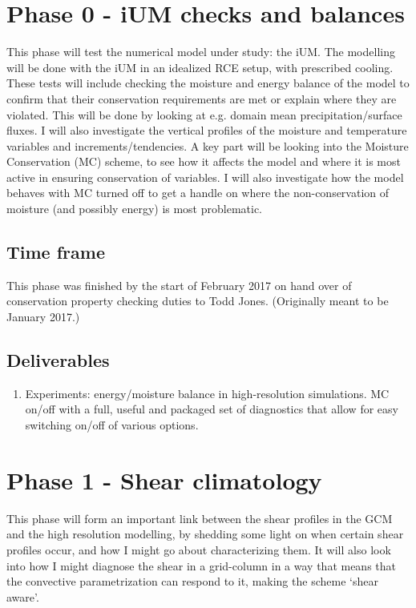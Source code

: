 \documentclass[11pt,a4paper]{article}
\begin{document}
\section*{Phase 0 - iUM checks and balances}
This phase will test the numerical model under study: the iUM. The modelling will be done with the iUM in an idealized RCE setup, with prescribed cooling. These tests will include checking the moisture and energy balance of the model to confirm that their conservation requirements are met or explain where they are violated. This will be done by looking at e.g. domain mean precipitation/surface fluxes. I will also investigate the vertical profiles of the moisture and temperature variables and increments/tendencies. A key part will be looking into the Moisture Conservation (MC) scheme, to see how it affects the model and where it is most active in ensuring conservation of variables. I will also investigate how the model behaves with MC turned off to get a handle on where the non-conservation of moisture (and possibly energy) is most problematic.

\subsection*{Time frame}

This phase was finished by the start of February 2017 on hand over of conservation property checking duties to Todd Jones. (Originally meant to be January 2017.)

\subsection*{Deliverables}
\begin{enumerate}
    \item Experiments: energy/moisture balance in high-resolution simulations. MC on/off with a full, useful and packaged set of diagnostics that allow for easy switching on/off of various options.
\end{enumerate}

\section*{Phase 1 - Shear climatology}

This phase will form an important link between the shear profiles in the GCM and the high resolution modelling, by shedding some light on when certain shear profiles occur, and how I might go about characterizing them. It will also look into how I might diagnose the shear in a grid-column in a way that means that the convective parametrization can respond to it, making the scheme `shear aware'.
\end{document}
